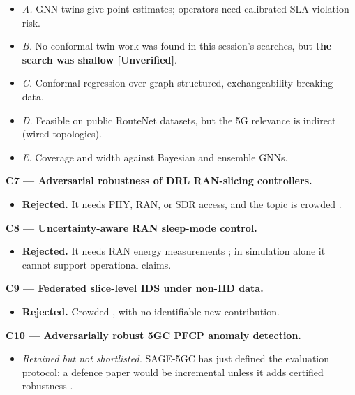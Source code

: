 \begin{itemize}
\tightlist
\item
  \emph{A.} GNN twins \citep{ferriolgalmes2023routenetfermi} give point
  estimates; operators need calibrated SLA-violation risk.
\item
  \emph{B.} No conformal-twin work was found in this session's searches,
  but \textbf{the search was shallow {[}Unverified{]}}.
\item
  \emph{C.} Conformal regression over graph-structured,
  exchangeability-breaking data.
\item
  \emph{D.} Feasible on public RouteNet datasets, but the 5G relevance
  is indirect (wired topologies).
\item
  \emph{E.} Coverage and width against Bayesian and ensemble GNNs.
\end{itemize}

\textbf{C7 --- Adversarial robustness of DRL RAN-slicing controllers.}

\begin{itemize}
\tightlist
\item
  \textbf{Rejected.} It needs PHY, RAN, or SDR access, and the topic is
  crowded
  \citep{shi2021attackdefend, tashman2026adversarial, wang2023robustslicing}.
\end{itemize}

\textbf{C8 --- Uncertainty-aware RAN sleep-mode control.}

\begin{itemize}
\tightlist
\item
  \textbf{Rejected.} It needs RAN energy measurements
  \citep{lopezperez2022energy}; in simulation alone it cannot support
  operational claims.
\end{itemize}

\textbf{C9 --- Federated slice-level IDS under non-IID data.}

\begin{itemize}
\tightlist
\item
  \textbf{Rejected.} Crowded \citep{lavaur2022fl, flaccshield2026}, with
  no identifiable new contribution.
\end{itemize}

\textbf{C10 --- Adversarially robust 5GC PFCP anomaly detection.}

\begin{itemize}
\tightlist
\item
  \emph{Retained but not shortlisted.} SAGE-5GC \citep{manca2026sage5gc}
  has just defined the evaluation protocol; a defence paper would be
  incremental unless it adds certified robustness
  \citep{robustcids2026}.
\end{itemize}

